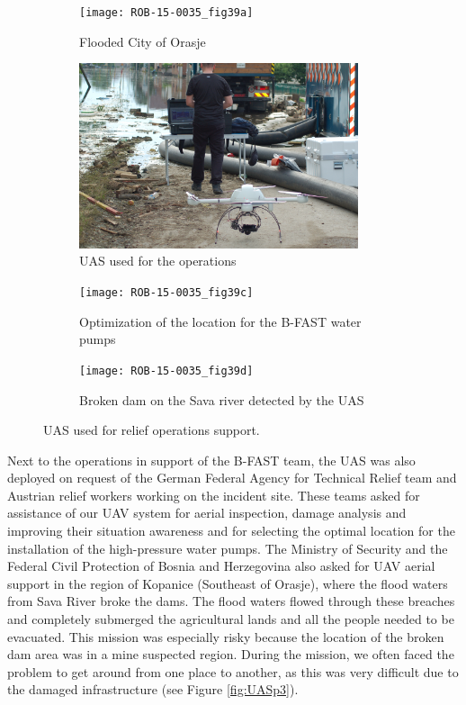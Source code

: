 \documentclass{article}
\begin{document}
\begin{figure}{
\centering
 \begin{subfigure}[t]{0.49\textwidth}    \centering          \texttt{[image: ROB-15-0035\_fig39a]}      	\caption{Flooded City of Orasje}                	\label{fig:UASp1}       	\end{subfigure}
\begin{subfigure}[t]{0.49\textwidth}       \centering       \includegraphics[width=0.9\textwidth]{ROB-15-0035_fig39b}      	\caption{UAS used for the operations}                	\label{fig:UASp1is}       	\end{subfigure}
 \begin{subfigure}[t]{0.49\textwidth}       \centering       \texttt{[image: ROB-15-0035\_fig39c]}      	\caption{Optimization of the location for the B-FAST water pumps}             \label{fig:UASp1b}       	\end{subfigure}
 \begin{subfigure} [t]{0.49\textwidth} 		\centering \texttt{[image: ROB-15-0035\_fig39d]}      		\caption{Broken dam on the Sava river detected by the UAS}	\label{fig:UASp2}  		\end{subfigure}
\caption{UAS used for relief operations support.}
\label{fig:bpicall}}
\end{figure}


Next to the operations in support of the B-FAST team, the UAS was also deployed on request of the German Federal Agency for Technical Relief team and Austrian relief workers working on the incident site.
These teams asked for assistance of our UAV system for aerial inspection, damage analysis and improving their situation awareness and for selecting the optimal location for the installation of the high-pressure water pumps.
The Ministry of Security and the Federal Civil Protection of Bosnia and Herzegovina also asked for UAV aerial support in the region of Kopanice (Southeast of Orasje), where the flood waters from Sava River broke the dams.
The flood waters  flowed through these breaches and completely submerged the agricultural lands and all the people needed to be evacuated.
This mission was especially risky because the location of the broken dam area was in a mine suspected region.
During the mission, we often faced the problem to get around from one place to another, as this was very difficult due to the damaged infrastructure (see Figure \ref{fig:UASp3}).
\end{document}
